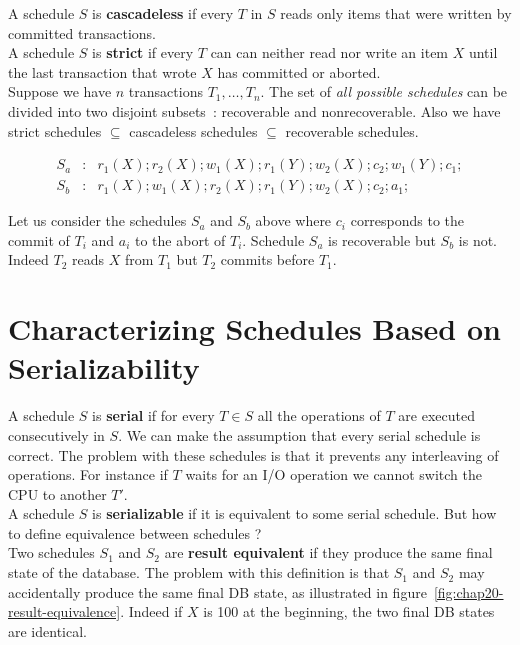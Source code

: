 A schedule $S$ is \textbf{cascadeless} if every $T$ in $S$ reads only items that were written by committed transactions. \\

A schedule $S$ is \textbf{strict} if every $T$ can can neither read nor write an item $X$ until the last transaction that wrote $X$ has committed or aborted. \\

Suppose we have $n$ transactions $T_1, \dots ,T_n$. The set of \textit{all possible schedules} can be divided into two disjoint subsets~: recoverable and nonrecoverable. Also we have strict schedules $\subseteq$ cascadeless schedules $\subseteq$ recoverable schedules.

\begin{eqnarray*}
S_a &:& r_1(X); r_2(X); w_1(X); r_1(Y); w_2(X); c_2; w_1(Y); c_1; \\
S_b &:& r_1(X); w_1(X); r_2(X); r_1(Y); w_2(X); c_2; a_1;
\end{eqnarray*}

Let us consider the schedules $S_a$ and $S_b$ above where $c_i$ corresponds to the commit of $T_i$ and $a_i$ to the abort of $T_i$. Schedule $S_a$ is recoverable but $S_b$ is not. Indeed $T_2$ reads $X$ from $T_1$ but $T_2$ commits before $T_1$.

\section{Characterizing Schedules Based on Serializability}
A schedule $S$ is \textbf{serial} if for every $T \in S$ all the operations of $T$ are executed consecutively in $S$. We can make the assumption that every serial schedule is correct. The problem with these schedules is that it prevents any interleaving of operations. For instance if $T$ waits for an I/O operation we cannot switch the CPU to another $T'$. \\

A schedule $S$ is \textbf{serializable} if it is equivalent to some serial schedule. But how to define equivalence between schedules ? \\

Two schedules $S_1$ and $S_2$ are \textbf{result equivalent} if they produce the same final state of the database. The problem with this definition is that $S_1$ and $S_2$ may accidentally produce the same final DB state, as illustrated in figure~\ref{fig:chap20-result-equivalence}. Indeed if $X$ is 100 at the beginning, the two final DB states are identical. \\

